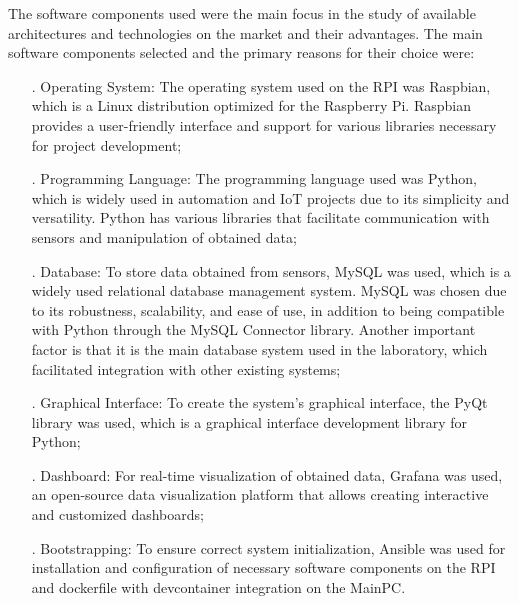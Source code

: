 The software components used were the main focus in the study of available architectures and technologies on the market and their advantages. The main software components selected and the primary reasons for their choice were:\begin{itemize}
    \item[.] Operating System: The operating system used on the RPI was Raspbian, which is a Linux distribution optimized for the Raspberry Pi. Raspbian provides a user-friendly interface and support for various libraries necessary for project development;
    \item[.] Programming Language: The programming language used was Python, which is widely used in automation and IoT projects due to its simplicity and versatility. Python has various libraries that facilitate communication with sensors and manipulation of obtained data;
    \item[.] Database: To store data obtained from sensors, MySQL was used, which is a widely used relational database management system. MySQL was chosen due to its robustness, scalability, and ease of use, in addition to being compatible with Python through the MySQL Connector library. Another important factor is that it is the main database system used in the laboratory, which facilitated integration with other existing systems;
    \item[.] Graphical Interface: To create the system's graphical interface, the PyQt library was used, which is a graphical interface development library for Python;
    \item[.] Dashboard: For real-time visualization of obtained data, Grafana was used, an open-source data visualization platform that allows creating interactive and customized dashboards;
    \item[.] Bootstrapping: To ensure correct system initialization, Ansible was used for installation and configuration of necessary software components on the RPI and dockerfile with devcontainer integration on the MainPC.
\end{itemize}

